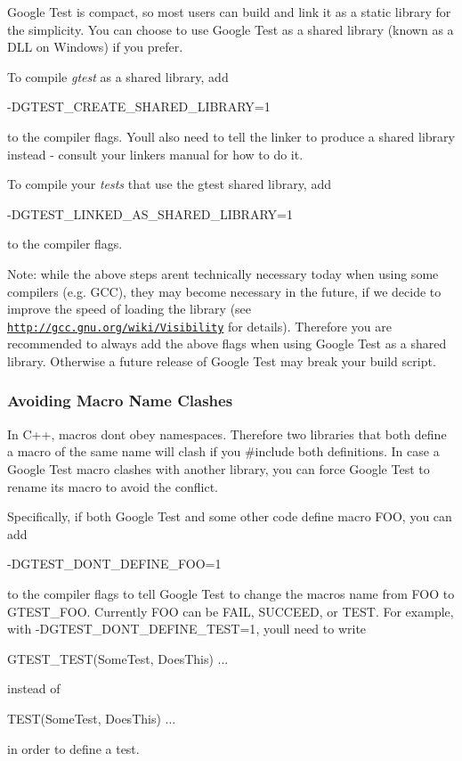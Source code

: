Google Test is compact, so most users can build and link it as a static library for the simplicity. You can choose to use Google Test as a shared library (known as a D\+LL on Windows) if you prefer.

To compile {\itshape gtest} as a shared library, add \begin{DoxyVerb}-DGTEST_CREATE_SHARED_LIBRARY=1
\end{DoxyVerb}


to the compiler flags. You\textquotesingle{}ll also need to tell the linker to produce a shared library instead -\/ consult your linker\textquotesingle{}s manual for how to do it.

To compile your {\itshape tests} that use the gtest shared library, add \begin{DoxyVerb}-DGTEST_LINKED_AS_SHARED_LIBRARY=1
\end{DoxyVerb}


to the compiler flags.

Note\+: while the above steps aren\textquotesingle{}t technically necessary today when using some compilers (e.\+g. G\+CC), they may become necessary in the future, if we decide to improve the speed of loading the library (see \href{http://gcc.gnu.org/wiki/Visibility}{\tt http\+://gcc.\+gnu.\+org/wiki/\+Visibility} for details). Therefore you are recommended to always add the above flags when using Google Test as a shared library. Otherwise a future release of Google Test may break your build script.

\subsubsection*{Avoiding Macro Name Clashes}

In C++, macros don\textquotesingle{}t obey namespaces. Therefore two libraries that both define a macro of the same name will clash if you {\ttfamily \#include} both definitions. In case a Google Test macro clashes with another library, you can force Google Test to rename its macro to avoid the conflict.

Specifically, if both Google Test and some other code define macro F\+OO, you can add \begin{DoxyVerb}-DGTEST_DONT_DEFINE_FOO=1
\end{DoxyVerb}


to the compiler flags to tell Google Test to change the macro\textquotesingle{}s name from {\ttfamily F\+OO} to {\ttfamily G\+T\+E\+S\+T\+\_\+\+F\+OO}. Currently {\ttfamily F\+OO} can be {\ttfamily F\+A\+IL}, {\ttfamily S\+U\+C\+C\+E\+ED}, or {\ttfamily T\+E\+ST}. For example, with {\ttfamily -\/\+D\+G\+T\+E\+S\+T\+\_\+\+D\+O\+N\+T\+\_\+\+D\+E\+F\+I\+N\+E\+\_\+\+T\+E\+ST=1}, you\textquotesingle{}ll need to write \begin{DoxyVerb}GTEST_TEST(SomeTest, DoesThis) { ... }
\end{DoxyVerb}


instead of \begin{DoxyVerb}TEST(SomeTest, DoesThis) { ... }
\end{DoxyVerb}


in order to define a test. 